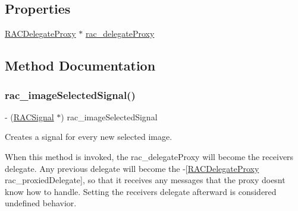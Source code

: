 \subsection*{Properties}
\begin{DoxyCompactItemize}
\item 
\mbox{\hyperlink{interface_r_a_c_delegate_proxy}{R\+A\+C\+Delegate\+Proxy}} $\ast$ \mbox{\hyperlink{category_u_i_image_picker_controller_07_r_a_c_signal_support_08_a37faa6b8c14f54b8751a216a048503da}{rac\+\_\+delegate\+Proxy}}
\end{DoxyCompactItemize}


\subsection{Method Documentation}
\mbox{\label{category_u_i_image_picker_controller_07_r_a_c_signal_support_08_ab9e581c9f1e505147acaae5b26c6be13}} 
\subsubsection{\texorpdfstring{rac\+\_\+image\+Selected\+Signal()}{rac\_imageSelectedSignal()}\hspace{0.1cm}{\footnotesize\ttfamily [1/3]}}
{\footnotesize\ttfamily -\/ (\mbox{\hyperlink{interface_r_a_c_signal}{R\+A\+C\+Signal}} $\ast$) rac\+\_\+image\+Selected\+Signal \begin{DoxyParamCaption}{ }\end{DoxyParamCaption}}

Creates a signal for every new selected image.

When this method is invoked, the {\ttfamily rac\+\_\+delegate\+Proxy} will become the receiver\textquotesingle{}s delegate. Any previous delegate will become the -\/\mbox{[}\mbox{\hyperlink{interface_r_a_c_delegate_proxy}{R\+A\+C\+Delegate\+Proxy}} rac\+\_\+proxied\+Delegate\mbox{]}, so that it receives any messages that the proxy doesn\textquotesingle{}t know how to handle. Setting the receiver\textquotesingle{}s {\ttfamily delegate} afterward is considered undefined behavior.

